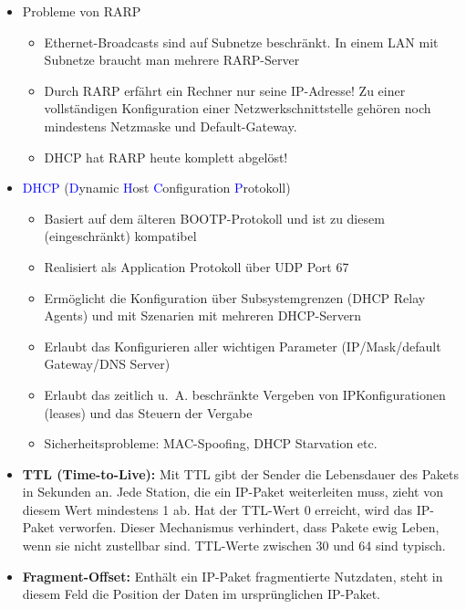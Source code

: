 \begin{itemize}
    \item Probleme von RARP
    \begin{itemize}
        \item Ethernet-Broadcasts sind auf Subnetze beschränkt.
        In einem LAN mit Subnetze braucht man mehrere RARP-Server
        \item Durch RARP erfährt ein Rechner nur seine IP-Adresse!
        Zu einer vollständigen Konfiguration einer Netzwerkschnittstelle gehören noch mindestens Netzmaske und Default-Gateway.
        \item DHCP hat RARP heute komplett abgelöst!
    \end{itemize}
    \item \textcolor{blue}{DHCP} (\textcolor{blue}{D}ynamic \textcolor{blue}{H}ost \textcolor{blue}{C}onfiguration \textcolor{blue}{P}rotokoll)
    \begin{itemize}
        \item Basiert auf dem älteren BOOTP-Protokoll und ist zu diesem (eingeschränkt) kompatibel
        \item Realisiert als Application Protokoll über UDP Port 67
        \item Ermöglicht die Konfiguration über Subsystemgrenzen (DHCP Relay Agents) und mit Szenarien mit mehreren DHCP-Servern
        \item Erlaubt das Konfigurieren aller wichtigen Parameter (IP/Mask/default Gateway/DNS Server)
        \item Erlaubt das zeitlich u.\ A. beschränkte Vergeben von IPKonfigurationen (leases) und das Steuern der Vergabe
        \item Sicherheitsprobleme: MAC-Spoofing, DHCP Starvation etc.
    \end{itemize}
\end{itemize}

\begin{itemize}
    \item \textbf{TTL (Time-to-Live): } Mit TTL gibt der Sender die Lebensdauer des Pakets in Sekunden an.
    Jede Station, die ein IP-Paket weiterleiten muss, zieht von diesem Wert mindestens 1 ab.
    Hat der TTL-Wert 0 erreicht, wird das IP-Paket verworfen.
    Dieser Mechanismus verhindert, dass Pakete ewig Leben, wenn sie nicht zustellbar sind.
    TTL-Werte zwischen 30 und 64 sind typisch.
    \item \textbf{Fragment-Offset:} Enthält ein IP-Paket fragmentierte Nutzdaten, steht in diesem Feld die Position der Daten im ursprünglichen IP-Paket.
\end{itemize}

